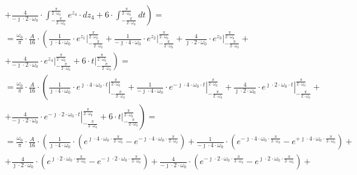 \begin{task}
\begin{align*}
&\left.+\frac{4}{-\jmath \cdot 2 \cdot \omega_0} \cdot \int_{-\frac{\pi}{2\cdot\omega_0}}^{\frac{\pi}{2\cdot\omega_0}} e^{z_4}\cdot dz_4 + 6 \cdot \int_{-\frac{\pi}{2\cdot\omega_0}}^{\frac{\pi}{2\cdot\omega_0}} dt \right)=\\
&=\frac{\omega_0}{\pi} \cdot \frac{A}{16} \cdot \left(\frac{1}{\jmath \cdot 4 \cdot \omega_0} \cdot \left. e^{z_1}\right|_{-\frac{\pi}{2\cdot\omega_0}}^{\frac{\pi}{2\cdot\omega_0}} +\frac{1}{-\jmath \cdot 4 \cdot \omega_0}\cdot \left. e^{z_2}\right|_{-\frac{\pi}{2\cdot\omega_0}}^{\frac{\pi}{2\cdot\omega_0}} +\frac{4}{\jmath \cdot 2 \cdot \omega_0}\cdot \left. e^{z_3}\right|_{-\frac{\pi}{2\cdot\omega_0}}^{\frac{\pi}{2\cdot\omega_0}} \right.+\\
&\left.+\frac{4}{-\jmath \cdot 2 \cdot \omega_0} \cdot \left. e^{z_4}\right|_{-\frac{\pi}{2\cdot\omega_0}}^{\frac{\pi}{2\cdot\omega_0}} + 6 \cdot  \left.t \right|_{-\frac{\pi}{2\cdot\omega_0}}^{\frac{\pi}{2\cdot\omega_0}}\right)=\\
&=\frac{\omega_0}{\pi} \cdot \frac{A}{16} \cdot \left(\frac{1}{\jmath \cdot 4 \cdot \omega_0} \cdot \left. e^{\jmath \cdot 4 \cdot \omega_0 \cdot t}\right|_{-\frac{\pi}{2\cdot\omega_0}}^{\frac{\pi}{2\cdot\omega_0}} +\frac{1}{-\jmath \cdot 4 \cdot \omega_0}\cdot \left. e^{-\jmath \cdot 4 \cdot \omega_0 \cdot t}\right|_{-\frac{\pi}{2\cdot\omega_0}}^{\frac{\pi}{2\cdot\omega_0}} +\frac{4}{\jmath \cdot 2 \cdot \omega_0}\cdot \left. e^{\jmath \cdot 2 \cdot \omega_0 \cdot t}\right|_{-\frac{\pi}{2\cdot\omega_0}}^{\frac{\pi}{2\cdot\omega_0}} \right.+\\
&\left.+\frac{4}{-\jmath \cdot 2 \cdot \omega_0} \cdot \left. e^{-\jmath \cdot 2 \cdot \omega_0 \cdot t}\right|_{-\frac{\pi}{2\cdot\omega_0}}^{\frac{\pi}{2\cdot\omega_0}} + 6 \cdot  \left.t \right|_{-\frac{\pi}{2\cdot\omega_0}}^{\frac{\pi}{2\cdot\omega_0}}\right)=\\
&=\frac{\omega_0}{\pi} \cdot \frac{A}{16} \cdot \left(\frac{1}{\jmath \cdot 4 \cdot \omega_0} \cdot \left( e^{\jmath \cdot 4 \cdot \omega_0 \cdot \frac{\pi}{2\cdot\omega_0}} - e^{-\jmath \cdot 4 \cdot \omega_0 \cdot \frac{\pi}{2\cdot\omega_0}}\right) +\frac{1}{-\jmath \cdot 4 \cdot \omega_0}\cdot \left( e^{-\jmath \cdot 4 \cdot \omega_0 \cdot \frac{\pi}{2\cdot\omega_0}} - e^{+\jmath \cdot 4 \cdot \omega_0 \cdot \frac{\pi}{2\cdot\omega_0}}\right) \right.+\\
&\left.+\frac{4}{\jmath \cdot 2 \cdot \omega_0}\cdot \left( e^{\jmath \cdot 2 \cdot \omega_0 \cdot \frac{\pi}{2\cdot\omega_0}} - e^{-\jmath \cdot 2 \cdot \omega_0 \cdot \frac{\pi}{2\cdot\omega_0}}\right) +\frac{4}{-\jmath \cdot 2 \cdot \omega_0} \cdot \left( e^{-\jmath \cdot 2 \cdot \omega_0 \cdot \frac{\pi}{2\cdot\omega_0}} - e^{\jmath \cdot 2 \cdot \omega_0 \cdot \frac{\pi}{2\cdot\omega_0}}\right) \right.+\\

\end{align*}
\end{task}
